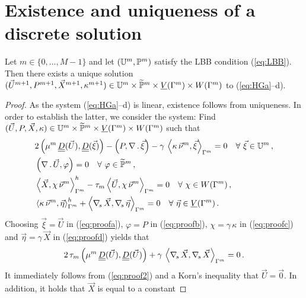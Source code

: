 \section{Existence and uniqueness of a discrete solution}
\label{sec:stokes_existence}
\begin{theorem} \label{thm:ex}
Let $m \in \{0,\ldots,M-1\}$ and
let $(\mathbb{U}^m,\mathbb{P}^m)$ satisfy the LBB condition (\ref{eq:LBB}).
Then there exists a unique solution
$(\vec U^{m+1}, P^{m+1}, \vec{X}^{m+1}, \kappa^{m+1})
\in \mathbb{U}^m\times \widetilde{\mathbb{P}}^m \times \underline{V}(\Gamma^m) \times W(\Gamma^m)$ to (\ref{eq:HGa}--d).
\end{theorem}
\begin{proof}
As the system (\ref{eq:HGa}--d) is linear, existence follows from uniqueness.
In order to establish the latter, we consider the system: Find $(\vec U, P,
\vec{X}, \kappa) \in \mathbb{U}^m\times\widetilde{\mathbb{P}}^m \times \underline{V}(\Gamma^m) \times W(\Gamma^m)$
such that
\begin{subequations}
\begin{align}
& 2\left(\mu^m\,\mat D(\vec U), \mat D(\vec \xi) \right)
- \left(P, \nabla\,.\,\vec \xi\right) - \gamma\,\left\langle \kappa\,\vec\nu^m,
\vec\xi\right\rangle_{\Gamma^m} = 0 \quad \forall\ \vec\xi \in \uspace^m \,,
\label{eq:proofa}\\
& \left(\nabla\,.\,\vec U, \varphi\right)  = 0 \quad
\forall\ \varphi \in \pnormspace^m\,, \label{eq:proofb} \\
& \left\langle \vec X, \chi\,\vec\nu^m \right\rangle_{\Gamma^m}^h -
\tau_m \left\langle \vec U, \chi\,\vec\nu^m \right\rangle_{\Gamma^m} = 0
\quad\forall\ \chi \in \Wh\,,\label{eq:proofc} \\
& \left\langle \kappa\,\vec\nu^m, \vec\eta \right\rangle_{\Gamma^m}^h
+ \left\langle \nabs\,\vec X, \nabs\,\vec \eta \right\rangle_{\Gamma^m}
= 0  \quad\forall\ \vec\eta \in \Vh\,. \label{eq:proofd}
\end{align}
\end{subequations}
Choosing $\vec\xi=\vec U$ in (\ref{eq:proofa}), $\varphi =  P$ in
(\ref{eq:proofb}), $\chi = \gamma\,\kappa$ in (\ref{eq:proofc}) and
$\vec\eta=\gamma\,\vec{X}$ in (\ref{eq:proofd}) yields that
\begin{equation}
2\,\tau_m\left(\mu^m\,\mat D(\vec U), \mat D(\vec U) \right)
+ \gamma\,\left\langle \nabs\,\vec{X}, \nabs\,\vec{X} \right\rangle_{\Gamma^m}
=0\,. \label{eq:proof2}
\end{equation}
It immediately follows from (\ref{eq:proof2}) and a Korn's inequality that
$\vec U = \vec 0$. In addition, it holds that $\vec{X}$ is equal to a constant

\end{proof}
